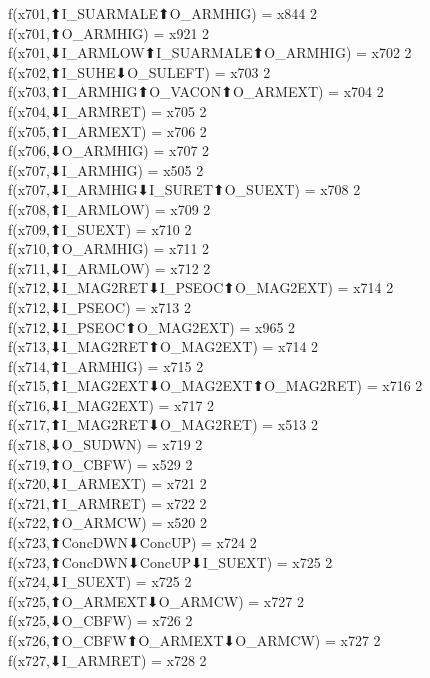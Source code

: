 f(x701,⬆I_SUARMALE⬆O_ARMHIG) = x844 {2} \\
f(x701,⬆O_ARMHIG) = x921 {2} \\
f(x701,⬇I_ARMLOW⬆I_SUARMALE⬆O_ARMHIG) = x702 {2} \\
f(x702,⬆I_SUHE⬇O_SULEFT) = x703 {2} \\
f(x703,⬆I_ARMHIG⬆O_VACON⬆O_ARMEXT) = x704 {2} \\
f(x704,⬇I_ARMRET) = x705 {2} \\
f(x705,⬆I_ARMEXT) = x706 {2} \\
f(x706,⬇O_ARMHIG) = x707 {2} \\
f(x707,⬇I_ARMHIG) = x505 {2} \\
f(x707,⬇I_ARMHIG⬇I_SURET⬆O_SUEXT) = x708 {2} \\
f(x708,⬆I_ARMLOW) = x709 {2} \\
f(x709,⬆I_SUEXT) = x710 {2} \\
f(x710,⬆O_ARMHIG) = x711 {2} \\
f(x711,⬇I_ARMLOW) = x712 {2} \\
f(x712,⬇I_MAG2RET⬇I_PSEOC⬆O_MAG2EXT) = x714 {2} \\
f(x712,⬇I_PSEOC) = x713 {2} \\
f(x712,⬇I_PSEOC⬆O_MAG2EXT) = x965 {2} \\
f(x713,⬇I_MAG2RET⬆O_MAG2EXT) = x714 {2} \\
f(x714,⬆I_ARMHIG) = x715 {2} \\
f(x715,⬆I_MAG2EXT⬇O_MAG2EXT⬆O_MAG2RET) = x716 {2} \\
f(x716,⬇I_MAG2EXT) = x717 {2} \\
f(x717,⬆I_MAG2RET⬇O_MAG2RET) = x513 {2} \\
f(x718,⬇O_SUDWN) = x719 {2} \\
f(x719,⬆O_CBFW) = x529 {2} \\
f(x720,⬇I_ARMEXT) = x721 {2} \\
f(x721,⬆I_ARMRET) = x722 {2} \\
f(x722,⬆O_ARMCW) = x520 {2} \\
f(x723,⬆ConcDWN⬇ConcUP) = x724 {2} \\
f(x723,⬆ConcDWN⬇ConcUP⬇I_SUEXT) = x725 {2} \\
f(x724,⬇I_SUEXT) = x725 {2} \\
f(x725,⬆O_ARMEXT⬇O_ARMCW) = x727 {2} \\
f(x725,⬇O_CBFW) = x726 {2} \\
f(x726,⬆O_CBFW⬆O_ARMEXT⬇O_ARMCW) = x727 {2} \\
f(x727,⬇I_ARMRET) = x728 {2} \\
